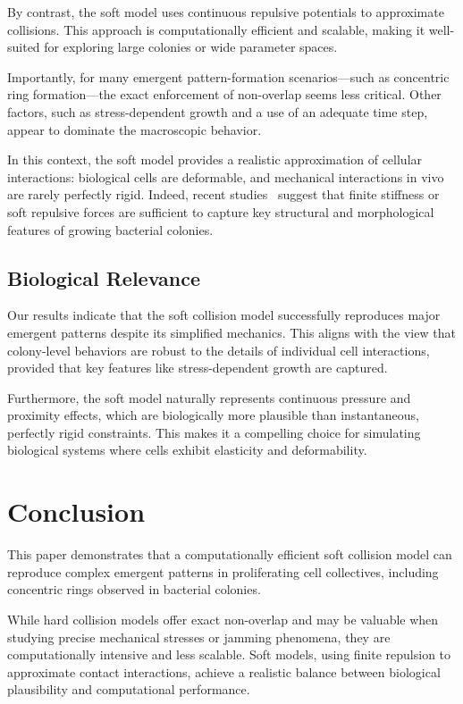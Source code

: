 \documentclass[conference]{IEEEtran}
\begin{document}
By contrast, the soft model uses continuous repulsive potentials to approximate collisions. This approach is computationally efficient and scalable, making it well-suited for exploring large colonies or wide parameter spaces.

Importantly, for many emergent pattern-formation scenarios—such as concentric ring formation—the exact enforcement of non-overlap seems less critical. Other factors, such as stress-dependent growth and a use of an adequate time step, appear to dominate the macroscopic behavior.

In this context, the soft model provides a realistic approximation of cellular interactions: biological cells are deformable, and mechanical interactions in vivo are rarely perfectly rigid. Indeed, recent studies~\cite{Khan_2024, Ghosh2015, SantosDiaz2025} suggest that finite stiffness or soft repulsive forces are sufficient to capture key structural and morphological features of growing bacterial colonies.

\subsection{Biological Relevance}

Our results indicate that the soft collision model successfully reproduces major emergent patterns despite its simplified mechanics. This aligns with the view that colony-level behaviors are robust to the details of individual cell interactions, provided that key features like stress-dependent growth are captured.

Furthermore, the soft model naturally represents continuous pressure and proximity effects, which are biologically more plausible than instantaneous, perfectly rigid constraints. This makes it a compelling choice for simulating biological systems where cells exhibit elasticity and deformability.

\section{Conclusion}

This paper demonstrates that a computationally efficient soft collision model can reproduce complex emergent patterns in proliferating cell collectives, including concentric rings observed in bacterial colonies.

While hard collision models offer exact non-overlap and may be valuable when studying precise mechanical stresses or jamming phenomena, they are computationally intensive and less scalable. Soft models, using finite repulsion to approximate contact interactions, achieve a realistic balance between biological plausibility and computational performance.
\end{document}
